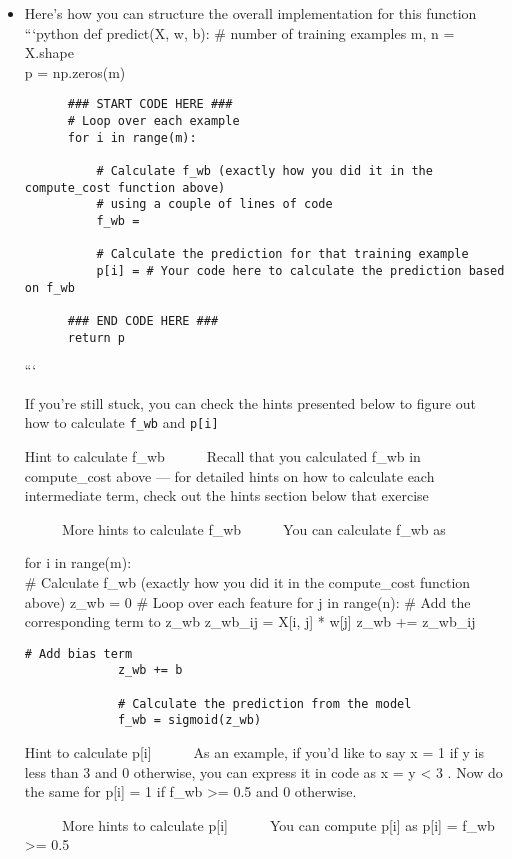 \documentclass[11pt]{article}
\begin{document}
\begin{itemize}
\item
  Here's how you can structure the overall implementation for this
  function ```python def predict(X, w, b): \# number of training
  examples m, n = X.shape\\
  p = np.zeros(m)

\begin{verbatim}
      ### START CODE HERE ### 
      # Loop over each example
      for i in range(m):   

          # Calculate f_wb (exactly how you did it in the compute_cost function above) 
          # using a couple of lines of code
          f_wb = 

          # Calculate the prediction for that training example 
          p[i] = # Your code here to calculate the prediction based on f_wb

      ### END CODE HERE ### 
      return p
\end{verbatim}

  ```

  If you're still stuck, you can check the hints presented below to
  figure out how to calculate \texttt{f\_wb} and \texttt{p{[}i{]}}

  Hint to calculate f\_wb     Recall that you calculated f\_wb in
  compute\_cost above --- for detailed hints on how to calculate each
  intermediate term, check out the hints section below that exercise

      More hints to calculate f\_wb     You can calculate f\_wb as

  for i in range(m):\\
  \# Calculate f\_wb (exactly how you did it in the compute\_cost
  function above) z\_wb = 0 \# Loop over each feature for j in range(n):
  \# Add the corresponding term to z\_wb z\_wb\_ij = X{[}i, j{]} *
  w{[}j{]} z\_wb += z\_wb\_ij

\begin{verbatim}
# Add bias term 
             z_wb += b

             # Calculate the prediction from the model
             f_wb = sigmoid(z_wb)
\end{verbatim}

  Hint to calculate p{[}i{]}     As an example, if you'd like to say x =
  1 if y is less than 3 and 0 otherwise, you can express it in code as x
  = y \textless{} 3 . Now do the same for p{[}i{]} = 1 if f\_wb
  \textgreater= 0.5 and 0 otherwise.

      More hints to calculate p{[}i{]}     You can compute p{[}i{]} as
  p{[}i{]} = f\_wb \textgreater= 0.5
\end{itemize}
\end{document}
